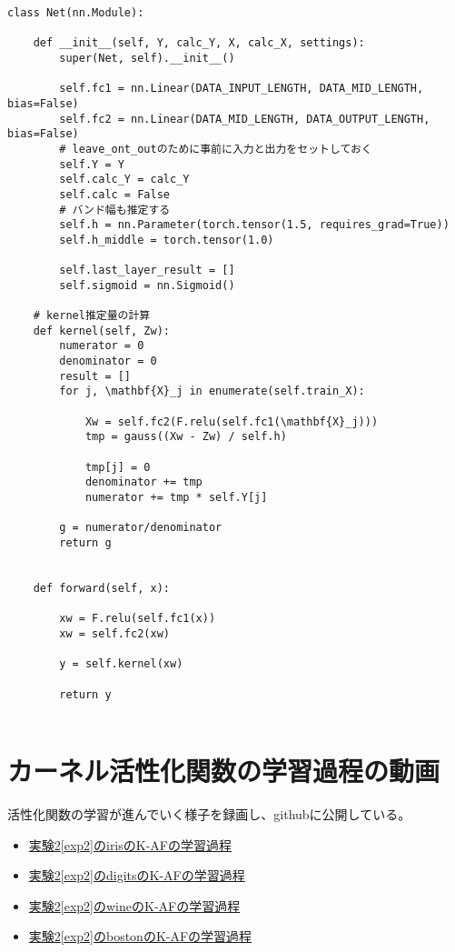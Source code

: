 \begin{lstlisting}[caption=Pytorchを用いたK-AFの計算用のクラス,label=python_impl]
class Net(nn.Module):

    def __init__(self, Y, calc_Y, X, calc_X, settings):
        super(Net, self).__init__()

        self.fc1 = nn.Linear(DATA_INPUT_LENGTH, DATA_MID_LENGTH, bias=False)
        self.fc2 = nn.Linear(DATA_MID_LENGTH, DATA_OUTPUT_LENGTH, bias=False)
        # leave_ont_outのために事前に入力と出力をセットしておく
        self.Y = Y
        self.calc_Y = calc_Y
        self.calc = False
        # バンド幅も推定する
        self.h = nn.Parameter(torch.tensor(1.5, requires_grad=True))
        self.h_middle = torch.tensor(1.0)

        self.last_layer_result = []
        self.sigmoid = nn.Sigmoid()

    # kernel推定量の計算
    def kernel(self, Zw):
        numerator = 0
        denominator = 0
        result = []
        for j, \mathbf{X}_j in enumerate(self.train_X):

            Xw = self.fc2(F.relu(self.fc1(\mathbf{X}_j)))
            tmp = gauss((Xw - Zw) / self.h)

            tmp[j] = 0
            denominator += tmp
            numerator += tmp * self.Y[j]

        g = numerator/denominator
        return g


    def forward(self, x):

        xw = F.relu(self.fc1(x))
        xw = self.fc2(xw)

        y = self.kernel(xw)

        return y


\end{lstlisting}


\chapter{カーネル活性化関数の学習過程の動画}
\label{appendix:movie}

活性化関数の学習が進んでいく様子を録画し、githubに公開している。



\begin{itemize}
  \item \href{https://github.com/latte0/RG-Thesis-Template/blob/main/asset/iris.mov?raw=true}{実験2\ref{exp2}のirisのK-AFの学習過程}
  \item \href{https://github.com/latte0/RG-Thesis-Template/blob/main/asset/digits.mov?raw=true}{実験2\ref{exp2}のdigitsのK-AFの学習過程}
  \item \href{https://github.com/latte0/RG-Thesis-Template/blob/main/asset/wine.mov?raw=true}{実験2\ref{exp2}のwineのK-AFの学習過程}
  \item \href{https://github.com/latte0/RG-Thesis-Template/blob/main/asset/boston.mov?raw=true}{実験2\ref{exp2}のbostonのK-AFの学習過程}
\end{itemize}

